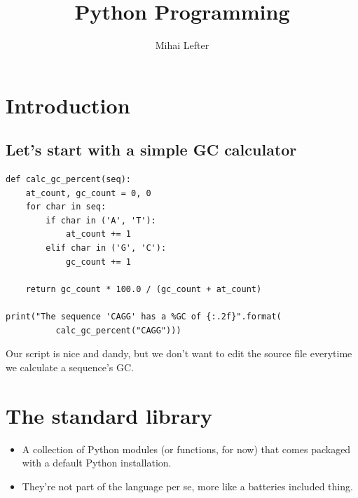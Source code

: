 \documentclass[aspectratio=1610,slidestop]{beamer}
\author{Mihai Lefter}
\title{Python Programming}
\newenvironment{pythonfile}[1]
 {\begin{tcolorbox}[title=#1,
                    title filled=false,
                    coltitle=LUMCDonkerblauw,
                    fonttitle=\scriptsize,
                    fontupper=\footnotesize,
                    enhanced,
                    drop small lifted shadow,
                    boxrule=0.1mm,
                    leftrule=5mm,
                    rulecolor=white,
                    left=0.1cm,
                    colback=white!92!black,
                    colframe=scriptback]}
 {\end{tcolorbox}}
\begin{document}


\section{Introduction}
\makeTableOfContents

\subsection{Let's start with a simple GC calculator}
\begin{pframe}
 \begin{pythonfile}{seq\_toolbox.py}
  \begin{verbatim}
def calc_gc_percent(seq):
    at_count, gc_count = 0, 0
    for char in seq:
        if char in ('A', 'T'):
            at_count += 1
        elif char in ('G', 'C'):
            gc_count += 1

    return gc_count * 100.0 / (gc_count + at_count)

print("The sequence 'CAGG' has a %GC of {:.2f}".format(
          calc_gc_percent("CAGG")))
  \end{verbatim}
 \end{pythonfile}
 \pause
 Our script is nice and dandy, but we don't want to edit the source file everytime we calculate a sequence's GC.
\end{pframe}



\section{The standard library}

\begin{pframe}
\begin{itemize}
  \item A collection of Python modules (or functions, for now) that comes packaged with a default Python installation.
  \item They're not part of the language per se, more like a batteries included thing.
\end{itemize}

\end{pframe}
\end{document}
